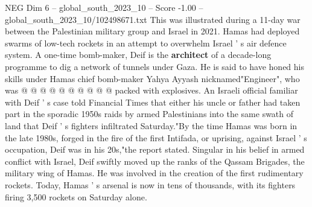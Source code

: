 \begin{textsample}{NEG Dim 6 – global\_south\_2023\_10 – Score -1.00 – global\_south\_2023\_10/102498671.txt}
This was illustrated during a 11-day war between the Palestinian military group and Israel in 2021.
Hamas had deployed swarms of low-tech rockets in an attempt to overwhelm Israel ' s air defence system.
A one-time bomb-maker, Deif is the \textbf{architect} of a decade-long programme to dig a network of tunnels under Gaza.
He is said to have honed his skills under Hamas chief bomb-maker Yahya Ayyash nicknamed"Engineer", who was @ @ @ @ @ @ @ @ @ @ packed with explosives.
An Israeli official familiar with Deif ' s case told Financial Times that either his uncle or father had taken part in the sporadic 1950s raids by armed Palestinians into the same swath of land that Deif ' s fighters infiltrated Saturday."By the time Hamas was born in the late 1980s, forged in the fire of the first Intifada, or uprising, against Israel ' s occupation, Deif was in his 20s,"the report stated.
Singular in his belief in armed conflict with Israel, Deif swiftly moved up the ranks of the Qassam Brigades, the military wing of Hamas.
He was involved in the creation of the first rudimentary rockets.
Today, Hamas ' s arsenal is now in tens of thousands, with its fighters firing 3,500 rockets on Saturday alone.

\end{textsample}
